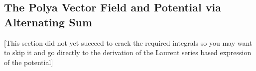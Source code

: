 \documentclass[12pt]{article}
\begin{document}


\subsection{The Polya Vector Field and Potential via Alternating Sum}
[This section did not yet succeed to crack the required integrals so you may want to skip it and go directly to the derivation of the Laurent series based expression of the potential]
\end{document}
